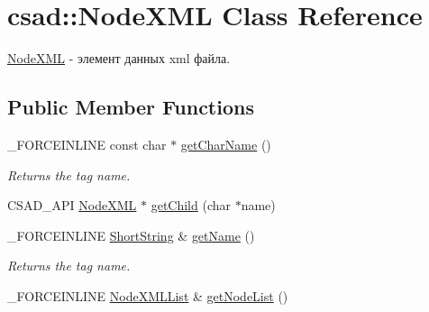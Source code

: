 \hypertarget{classcsad_1_1_node_x_m_l}{\section{csad\-:\-:Node\-X\-M\-L Class Reference}
\label{classcsad_1_1_node_x_m_l}
}


\hyperlink{classcsad_1_1_node_x_m_l}{Node\-X\-M\-L} -\/ элемент данных xml файла.  


\subsection*{Public Member Functions}
\begin{DoxyCompactItemize}
\item 
\hypertarget{classcsad_1_1_node_x_m_l_ac0651771bc96fba9d355a35d095adacd}{\-\_\-\-F\-O\-R\-C\-E\-I\-N\-L\-I\-N\-E const char $\ast$ \hyperlink{classcsad_1_1_node_x_m_l_ac0651771bc96fba9d355a35d095adacd}{get\-Char\-Name} ()}\label{classcsad_1_1_node_x_m_l_ac0651771bc96fba9d355a35d095adacd}

\begin{DoxyCompactList}\small\item\em Returns the tag name. \end{DoxyCompactList}\item 
C\-S\-A\-D\-\_\-\-A\-P\-I \hyperlink{classcsad_1_1_node_x_m_l}{Node\-X\-M\-L} $\ast$ \hyperlink{classcsad_1_1_node_x_m_l_a9c768e31866e7f8439485baaf24d7599}{get\-Child} (char $\ast$name)
\item 
\hypertarget{classcsad_1_1_node_x_m_l_a6d610edfac400cb78e0e94743dd3da1a}{\-\_\-\-F\-O\-R\-C\-E\-I\-N\-L\-I\-N\-E \hyperlink{classbt_1_1_short_string}{Short\-String} \& \hyperlink{classcsad_1_1_node_x_m_l_a6d610edfac400cb78e0e94743dd3da1a}{get\-Name} ()}\label{classcsad_1_1_node_x_m_l_a6d610edfac400cb78e0e94743dd3da1a}

\begin{DoxyCompactList}\small\item\em Returns the tag name. \end{DoxyCompactList}\item 
\hypertarget{classcsad_1_1_node_x_m_l_a60de99ca441f3dbb28a998ad0a8ce984}{\-\_\-\-F\-O\-R\-C\-E\-I\-N\-L\-I\-N\-E \hyperlink{classbt_1_1_void_vector}{Node\-X\-M\-L\-List} \& \hyperlink{classcsad_1_1_node_x_m_l_a60de99ca441f3dbb28a998ad0a8ce984}{get\-Node\-List} ()}\label{classcsad_1_1_node_x_m_l_a60de99ca441f3dbb28a998ad0a8ce984}


\end{DoxyCompactItemize}
